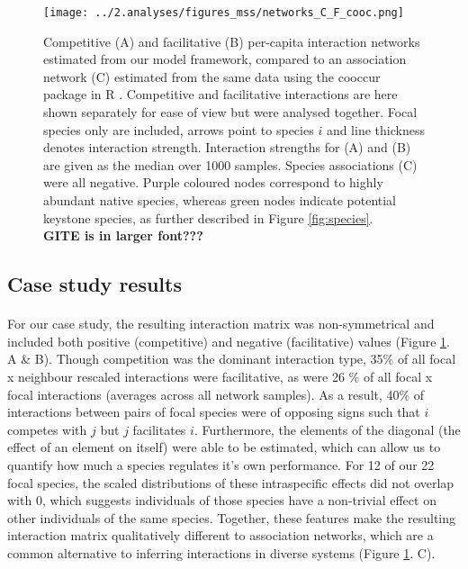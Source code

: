 \documentclass[a4,12pt]{article}
\begin{document}
    \begin{figure}[H]
        \begin{centering}
        \texttt{[image: ../2.analyses/figures\_mss/networks\_C\_F\_cooc.png]}
        \caption{Competitive (A) and facilitative (B) per-capita interaction networks estimated from our model framework, compared to an association network (C) estimated from the same data using the cooccur package in R \parencite{Griffith2016}. Competitive and facilitative interactions are here shown separately for ease of view but were analysed together. Focal species only are included, arrows point to species $i$ and line thickness denotes interaction strength. Interaction strengths for (A) and (B) are given as the median over 1000 samples. Species associations (C) were all negative. 
        Purple coloured nodes correspond to highly abundant native species, whereas green nodes indicate potential keystone species, as further described in Figure \ref{fig:species}. \\
        \textbf{GITE is in larger font???}}
        \label{fig:netwks}
       \end{centering}
    \end{figure}    


    \subsection{Case study results}

    \paragraph{}
     For our case study, the resulting interaction matrix was non-symmetrical and included both positive (competitive) and negative (facilitative) values (Figure \ref{fig:netwks}. A \& B). Though competition was the dominant interaction type,  35\% of all focal x neighbour rescaled interactions were facilitative, as were 26 \% of all focal x focal interactions (averages across all network samples). As a result, 40\% of interactions between pairs of focal species were of opposing signs such that $i$ competes with $j$ but $j$ facilitates $i$. 
     Furthermore, the elements of the diagonal (the effect of an element on itself) were able to be estimated, which can allow us to quantify how much a species regulates it's own performance. For 12 of our 22 focal species, the scaled distributions of these intraspecific effects did not overlap with 0, which suggests individuals of those species have a non-trivial effect on other individuals of the same species. Together, these features make the resulting interaction matrix qualitatively different to association networks, which are a common alternative to inferring interactions in diverse systems (Figure \ref{fig:netwks}. C). 
\end{document}
